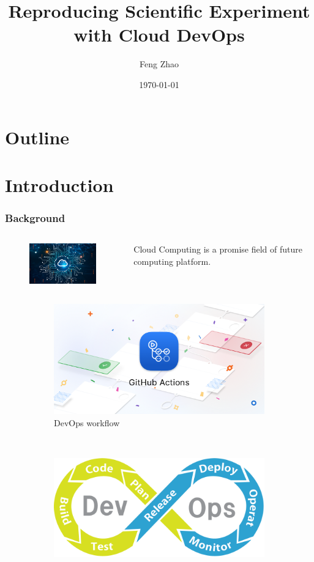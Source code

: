 \documentclass[notheorems]{beamer}
\title{Reproducing Scientific Experiment with Cloud DevOps}
\author{Feng Zhao}
\date{\today}
\begin{document}
\begin{frame}
	\titlepage
\end{frame}
\section*{Outline}
\begin{frame}
	\tableofcontents
\end{frame}

\section{Introduction}
\begin{frame}
\frametitle{Background}
	\begin{columns}
		\column{5cm}
		\begin{figure}
			\includegraphics[width=4cm]{pic/cloud_computing.png}
		\end{figure}
		\column{5cm}
	Cloud Computing is 	a promise field of future computing platform.
		\end{columns}
\begin{figure}
	\centering
	\begin{subfigure}{0.33\textwidth}
		\includegraphics[width=\textwidth]{pic/github_actions.png}
		\caption{DevOps workflow}
	\end{subfigure}~~~~~
	\begin{subfigure}{0.33\textwidth}
		\includegraphics[width=\textwidth]{pic/general_workflow.png}

\end{subfigure}
\end{figure}
\end{frame}
\end{document}
